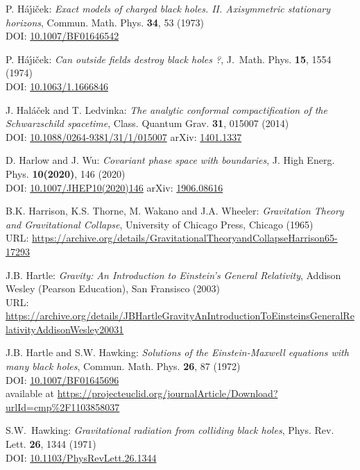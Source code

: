 \begin{thebibliography}{123}
P. H\'a\'\j i\v{c}ek:
{\em Exact models of charged black holes.
II. Axisymmetric stationary horizons},
Commun. Math. Phys. {\bf 34}, 53 (1973)\\
DOI: \href{https://doi.org/10.1007/BF01646542}{10.1007/BF01646542}

P. H\'a\'\j i\v{c}ek:
{\em Can outside fields destroy black holes ?},
J.~Math. Phys. {\bf 15}, 1554 (1974)\\
DOI: \href{https://doi.org/10.1063/1.1666846}{10.1063/1.1666846}

J. Hal\'a\v{c}ek and T. Ledvinka:
{\em The analytic conformal compactification of the Schwarzschild spacetime},
Class. Quantum Grav. {\bf 31}, 015007 (2014)\\
DOI: \href{https://doi.org/10.1088/0264-9381/31/1/015007}{10.1088/0264-9381/31/1/015007}\hfill
arXiv: \href{https://arxiv.org/abs/1401.1337}{1401.1337}

D. Harlow and J. Wu:
{\em Covariant phase space with boundaries},
J. High Energ. Phys. {\bf 10(2020)}, 146 (2020)\\
DOI: \href{https://doi.org/10.1007/JHEP10(2020)146}{10.1007/JHEP10(2020)146}\hfill
arXiv: \href{https://arxiv.org/abs/1906.08616}{1906.08616}

B.K. Harrison, K.S. Thorne, M. Wakano and J.A. Wheeler:
{\em Gravitation Theory and Gravitational Collapse},
University of Chicago Press, Chicago (1965)\\
URL: {\footnotesize\url{https://archive.org/details/GravitationalTheoryandCollapseHarrison65-17293}}

J.B. Hartle: \emph{Gravity: An Introduction to Einstein's General Relativity},
Addison Wesley (Pearson Education), San Fransisco (2003)\\
URL: {\footnotesize\url{https://archive.org/details/JBHartleGravityAnIntroductionToEinsteinsGeneralRelativityAddisonWesley20031}}

J.B. Hartle and S.W. Hawking:
{\em Solutions of the Einstein-Maxwell equations with many black holes},
Commun. Math. Phys. {\bf 26}, 87 (1972)\\
DOI: \href{https://doi.org/10.1007/BF01645696}{10.1007/BF01645696}\\
available at {\footnotesize\url{https://projecteuclid.org/journalArticle/Download?urlId=cmp%2F1103858037}}

S.W.~Hawking:
{\em Gravitational radiation from colliding black holes},
Phys. Rev. Lett. {\bf 26}, 1344 (1971)\\
DOI: \href{https://doi.org/10.1103/PhysRevLett.26.1344}{10.1103/PhysRevLett.26.1344}


\end{thebibliography}
